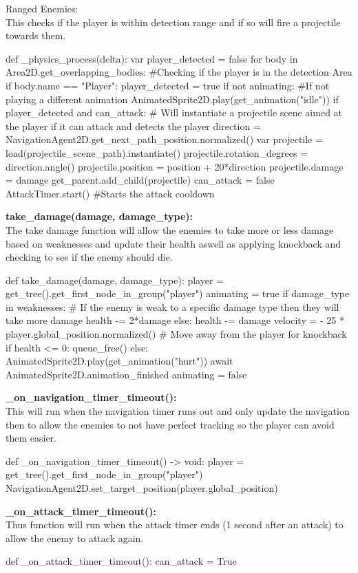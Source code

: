 \documentclass{article}
\begin{document}
        Ranged Enemies:\\
        This checks if the player is within detection range and if so will fire a projectile towards them.\\
        \begin{python}
def _physics_process(delta):
   var player_detected = false
   for body in Area2D.get_overlapping_bodies: #Checking if the player is in the detection Area
      if body.name == "Player":
         player_detected = true
   if not animating: #If not playing a different animation
      AnimatedSprite2D.play(get_animation("idle"))
      if player_detected and can_attack: # Will instantiate a projectile scene aimed at the player if it can attack and detects the player
         direction = NavigationAgent2D.get_next_path_position.normalized()
         var projectile = load(projectile_scene_path).instantiate()
         projectile.rotation_degrees = direction.angle()
         projectile.position = position + 20*direction
         projectile.damage = damage
         get_parent.add_child(projectile)
         can_attack = false
         AttackTimer.start() #Starts the attack cooldown
        \end{python}
        \textbf{take\_damage(damage, damage\_type):}\\
        The take damage function will allow the enemies to take more or less damage based on weaknesses and update their health aswell as applying knockback and checking to see if the enemy should die.\\
        \begin{python}
def take_damage(damage, damage_type):
   player = get_tree().get_first_node_in_group("player")
   animating = true
   if damage_type in weaknesses: # If the enemy is weak to a specific damage type then they will take more damage
      health -= 2*damage
   else:
      health -= damage
   velocity = - 25 * player.global_position.normalized() # Move away from the player for knockback
   if health <= 0:
      queue_free()
   else:
      AnimatedSprite2D.play(get_animation("hurt"))
      await AnimatedSprite2D.animation_finished
      animating = false
        \end{python}
        \textbf{\_on\_navigation\_timer\_timeout():}\\
        This will run when the navigation timer runs out and only update the navigation then to allow the enemies to not have perfect tracking so the player can avoid them easier.\\
        \begin{python}
def _on_navigation_timer_timeout() -> void:
   player = get_tree().get_first_node_in_group("player")
   NavigationAgent2D.set_target_position(player.global_position)
        \end{python}
        \textbf{\_on\_attack\_timer\_timeout():}\\
        Thus function will run when the attack timer ends (1 second after an attack) to allow the enemy to attack again.\\
        \begin{python}
def _on_attack_timer_timeout():
   can_attack = True
        \end{python}
\end{document}
